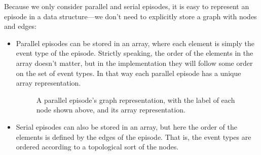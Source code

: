 Because we only consider parallel and serial episodes, it is easy to represent an episode in a data structure---we don't need to explicitly store a graph with nodes and edges:
\begin{itemize}
\item Parallel episodes can be stored in an array, where each element is simply the event type of the episode. Strictly speaking, the order of the elements in the array doesn't matter, but in the implementation they will follow some order on the set of event types. In that way each parallel episode has a unique array representation.


\begin{figure}[h]
\centering


\caption{A parallel episode's graph representation, with the label of each node shown above, and its array representation.}

\label{fig:parallel-representation}
\end{figure}

\item Serial episodes can also be stored in an array, but here the order of the elements is defined by the edges of the episode. That is, the event types are ordered according to a topological sort of the nodes.

\begin{figure}
\centering

\begin{tikzpicture}


\end{tikzpicture}
\end{figure}
\end{itemize}
